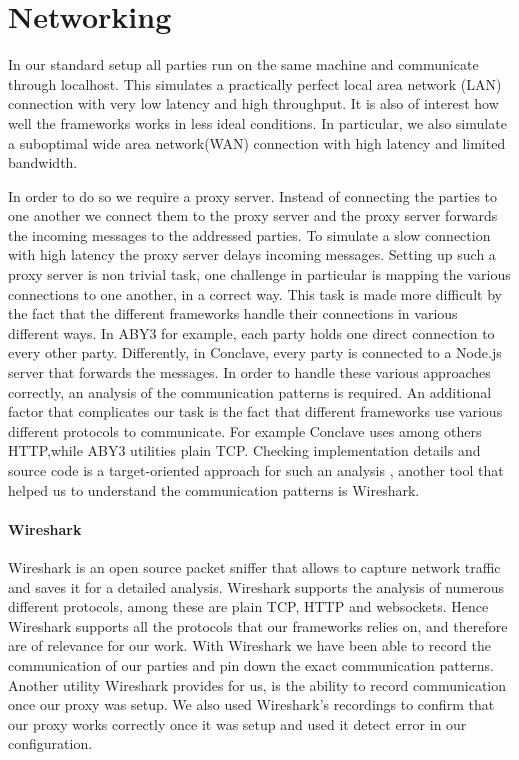 \section{Networking}
In our standard setup all parties run on the same machine and communicate through localhost. This simulates a practically perfect local area network (LAN) connection with very low latency and high throughput. It is also of interest how well the frameworks works in less ideal conditions. In particular, we also simulate a suboptimal wide area network(WAN) connection with high latency and limited bandwidth.

In order to do so we require a proxy server. Instead of connecting the parties to one another we connect them to the proxy server and the proxy server forwards the incoming messages to the addressed parties. To simulate a slow connection with high latency the proxy server delays incoming messages. Setting up such a proxy server is non trivial task, one challenge in particular is mapping the various connections to one another, in a correct way. This task is made more difficult by the fact that the different frameworks handle their connections in various different ways. In ABY3 for example, each party holds one direct connection to every other party. Differently, in Conclave, every party is connected to a Node.js server that forwards the messages. In order to handle these various approaches correctly, an analysis of the communication patterns is required. An additional factor that complicates our task is the fact that different frameworks use various different protocols to communicate. For example Conclave uses among others HTTP,while ABY3 utilities plain TCP. Checking implementation details and source code is a target-oriented approach for such an analysis , another tool that helped us to understand the communication patterns is Wireshark.      
\paragraph{Wireshark}
Wireshark \cite{wireshark} is an open source packet sniffer that allows to capture network traffic and saves it for a detailed analysis. Wireshark supports the analysis of numerous different protocols, among these are plain TCP, HTTP and websockets. Hence Wireshark supports all the protocols that our frameworks relies on, and therefore are of relevance for our work. With Wireshark we have been able to record the communication of our parties and pin down the exact communication patterns. Another utility Wireshark provides for us, is the ability to record communication once our proxy was setup. We also used Wireshark's recordings to confirm that our proxy works correctly once it was setup and used it detect error in our configuration. 
                

